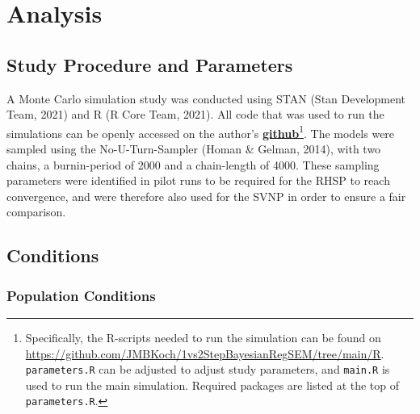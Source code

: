 \documentclass[
  man, donotrepeattitle,floatsintext]{apa6}
\begin{document}
\hypertarget{analysis}{%
\section{Analysis}\label{analysis}}

\hypertarget{study-procedure-and-parameters}{%
\subsection{Study Procedure and Parameters}\label{study-procedure-and-parameters}}

A Monte Carlo simulation study was conducted using STAN (Stan Development Team, 2021) and R (R Core Team, 2021). All code that was used to run the simulations can be openly accessed on the author's \href{https://github.com/JMBKoch/1vs2StepBayesianRegSEM}{\textbf{github}}\footnote{Specifically, the R-scripts needed to run the simulation can be found on \url{https://github.com/JMBKoch/1vs2StepBayesianRegSEM/tree/main/R}. \texttt{parameters.R} can be adjusted to adjust study parameters, and \texttt{main.R} is used to run the main simulation. Required packages are listed at the top of \texttt{parameters.R}.}. The models were sampled using the No-U-Turn-Sampler (Homan \& Gelman, 2014), with two chains, a burnin-period of 2000 and a chain-length of 4000. These sampling parameters were identified in pilot runs to be required for the RHSP to reach convergence, and were therefore also used for the SVNP in order to ensure a fair comparison.

\hypertarget{conditions}{%
\subsection{Conditions}\label{conditions}}

\hypertarget{population-conditions}{%
\subsubsection{Population Conditions}\label{population-conditions}}
\end{document}
